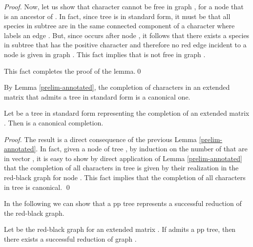 \documentclass{llncs}
\begin{document}
\begin{proof}
Now, let us show that   character  cannot be free   in graph , for  a node that is an ancestor of . In fact, since tree  is in standard form, it must be that all species in subtree  are in the same connected component of a character  where  labels an edge  . But, since  occurs after node , it follows that there exists a species   in subtree  that has the positive  character  and  therefore  no  red edge incident to  a node  is given in graph . This fact implies that  is not free in graph .


This fact  completes  the proof of the lemma.\qed




\end{proof}



By  Lemma \ref{prelim-annotated}, the completion of characters in an extended matrix  that admits a tree in standard form is a canonical one.

\begin{corollary}
\label{cor-annotated}
Let  be a tree in standard form  representing the completion  of an extended matrix . Then  is a canonical completion.
\end{corollary}

\begin{proof}
The result is a direct consequence of the previous Lemma \ref{prelim-annotated}. In fact, given a node  of tree , by induction on the number of  that  are in   vector ,  it is easy to show by  direct application of Lemma \ref{prelim-annotated} that the completion of all characters in tree  is given by   their realization   in the red-black graph  for node . This fact implies that the completion of all characters in tree  is canonical.
\qed
\end{proof}

 In the following we can show that a pp tree   represents a successful reduction of the red-black graph.
 
\begin{lemma}
\label{first-direction}
Let  be the red-black graph for an extended matrix  . If   admits a  pp tree, then there exists a successful reduction of graph .
\end{lemma}
\end{document}
